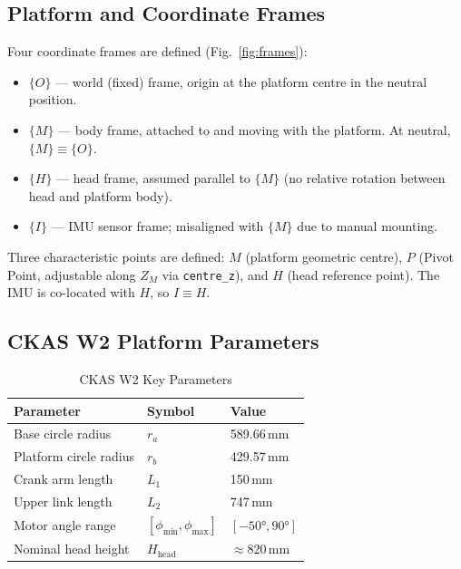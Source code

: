 \documentclass[conference]{IEEEtran}
\newcommand{\mm}{\,\text{mm}}
\begin{document}
\subsection{Platform and Coordinate Frames}

Four coordinate frames are defined (Fig.~\ref{fig:frames}):
\begin{itemize}
  \item $\{O\}$ — world (fixed) frame, origin at the platform centre
        in the neutral position.
  \item $\{M\}$ — body frame, attached to and moving with the platform.
        At neutral, $\{M\} \equiv \{O\}$.
  \item $\{H\}$ — head frame, assumed parallel to $\{M\}$ (no relative
        rotation between head and platform body).
  \item $\{I\}$ — IMU sensor frame; misaligned with $\{M\}$ due to
        manual mounting.
\end{itemize}

Three characteristic points are defined:
$M$ (platform geometric centre),
$P$ (Pivot Point, adjustable along $Z_M$ via \texttt{centre\_z}),
and $H$ (head reference point).
The IMU is co-located with $H$, so $I \equiv H$.

\subsection{CKAS W2 Platform Parameters}

\begin{table}[!t]
  \caption{CKAS W2 Key Parameters}
  \label{tab:params}
  \centering
  \renewcommand{\arraystretch}{1.15}
  \begin{tabular}{lll}
    \toprule
    Parameter & Symbol & Value \\
    \midrule
    Base circle radius   & $r_a$   & 589.66\,mm \\
    Platform circle radius & $r_b$ & 429.57\,mm \\
    Crank arm length     & $L_1$   & 150\,mm \\
    Upper link length    & $L_2$   & 747\,mm \\
    Motor angle range    & $[\phi_\mathrm{min},\phi_\mathrm{max}]$ & $[-50°,90°]$ \\
    Nominal head height  & $H_\mathrm{head}$ & $\approx 820\mm$ \\
    \bottomrule
  \end{tabular}
\end{table}
\end{document}
